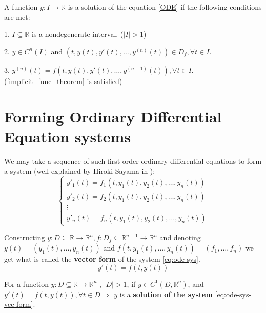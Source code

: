 \begin{definition}
	A function $y:I \rightarrow \mathbb{R}$ is a solution of the equation \ref{ODE} if the following conditions are met:

	1. $I \subseteq \mathbb{R}$ is a nondegenerate interval. ($|I|>1$)

	2. $y \in C^n(I)$ and $(t,y(t), y'(t), \dots, y^{(n)}(t)) \in D_f, \forall t \in I$.

	3. $y^{(n)}(t)= f(t,y(t),y'(t),\dots,y^{ (n-1) }(t)), \forall t \in I$. (\ref{implicit_func_theorem} is satisfied)

\end{definition}

\section{Forming Ordinary Differential Equation systems}
We may take a sequence of such first order ordinary differential equations to form a system (well explained by Hiroki Sayama in \cite{Hiroki2015}):
\begin{equation}\label{eq:ode-sys}
	\begin{cases}
		y'_1(t) = f_1(t,y_1(t),y_2(t),\dots,y_n(t)) \\
		y'_2(t) = f_2(t,y_1(t),y_2(t),\dots,y_n(t)) \\
		\vdots                                      \\
		y'_n(t) = f_n(t,y_1(t),y_2(t),\dots,y_n(t))
	\end{cases}
\end{equation}

Constructing $y: D \subseteq \mathbb{R} \rightarrow \mathbb{R}^n, f : D_f \subseteq \mathbb{R}^{n+1} \rightarrow \mathbb{R}^n$ and denoting \\
$y(t)= (y_1(t), \dots, y_n(t))$ and $f(t,y_1(t),\dots,y_n(t)) = (f_1,\dots,f_n)$ we get what is called the \textbf{vector form} of the system \ref{eq:ode-sys}.
\begin{equation}\label{eq:ode-sys-vec-form}
	y'(t) = f (t, y(t))
\end{equation}

\begin{definition}
	For a function $y:D \subseteq \mathbb{R} \rightarrow \mathbb{R}^n$ , $|D| > 1$, if $y \in C^1(D,\mathbb{R}^n)$, and $y'(t) = f(t,y(t)), \forall t \in D \Rightarrow$ $y$ is a \textbf{solution of the system} \ref{eq:ode-sys-vec-form}.
\end{definition}

